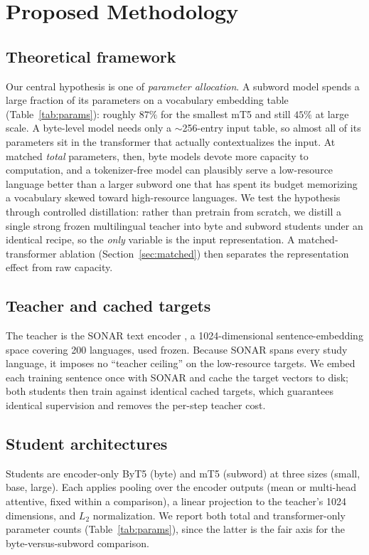 \documentclass[11pt]{article}
\begin{document}
\section{Proposed Methodology}
\label{sec:method}

\subsection{Theoretical framework}
Our central hypothesis is one of \emph{parameter allocation}. A subword model spends a large fraction
of its parameters on a vocabulary embedding table (Table~\ref{tab:params}): roughly $87\%$ for the
smallest mT5 and still $45\%$ at large scale. A byte-level model needs only a $\sim$256-entry input
table, so almost all of its parameters sit in the transformer that actually contextualizes the input.
At matched \emph{total} parameters, then, byte models devote more capacity to computation, and a
tokenizer-free model can plausibly serve a low-resource language better than a larger subword one that
has spent its budget memorizing a vocabulary skewed toward high-resource languages. We test the
hypothesis through controlled distillation: rather than pretrain from scratch, we distill a single
strong frozen multilingual teacher into byte and subword students under an identical recipe, so the
\emph{only} variable is the input representation. A matched-transformer ablation
(Section~\ref{sec:matched}) then separates the representation effect from raw capacity.

\subsection{Teacher and cached targets}
The teacher is the SONAR text encoder \citep{duquenne2023sonar}, a 1024-dimensional sentence-embedding
space covering 200 languages, used frozen. Because SONAR spans every study language, it imposes no
``teacher ceiling'' on the low-resource targets. We embed each training sentence once with SONAR and
cache the target vectors to disk; both students then train against identical cached targets, which
guarantees identical supervision and removes the per-step teacher cost.

\subsection{Student architectures}
Students are encoder-only ByT5 \citep{xue2022byt5} (byte) and mT5 \citep{xue2021mt5} (subword) at
three sizes (small, base, large). Each applies pooling over the encoder outputs (mean or multi-head
attentive, fixed within a comparison), a linear projection to the teacher's 1024 dimensions, and
$L_2$ normalization. We report both total and transformer-only parameter counts
(Table~\ref{tab:params}), since the latter is the fair axis for the byte-versus-subword comparison.
\end{document}

